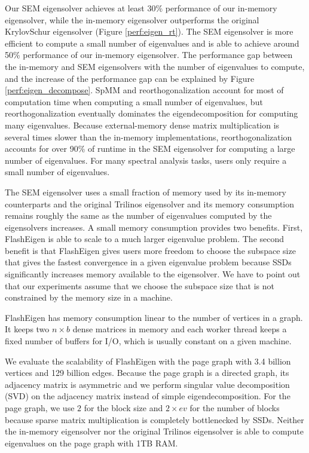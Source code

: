 Our SEM eigensolver achieves at least 30\% performance of our in-memory
eigensolver, while the in-memory eigensolver outperforms the original
KrylovSchur eigensolver (Figure \ref{perf:eigen_rt}). The SEM eigensolver
is more efficient to compute a small number of eigenvalues and is able
to achieve around 50\% performance of our in-memory eigensolver.
The performance gap between the in-memory and SEM eigensolvers with the number
of eigenvalues to compute, and the increase of the performance gap can be
explained by Figure \ref{perf:eigen_decompose}. SpMM and reorthogonalization
account for most of computation time when computing a small number of eigenvalues,
but reorthogonalization eventually dominates the eigendecomposition for computing
many eigenvalues. Because external-memory dense matrix multiplication is several
times slower than the in-memory implementations, reorthogonalization accounts for
over 90\% of runtime in the SEM eigensolver for computing a large number of
eigenvalues. For many spectral analysis tasks, users only require a small number
of eigenvalues.

%		

The SEM eigensolver uses a small fraction of memory used by its in-memory
counterparts and the original Trilinos eigensolver and its memory consumption
remains roughly the same as the number of eigenvalues computed by the eigensolvers
increases. A small memory consumption provides two benefits. First, FlashEigen
is able to scale to a much larger eigenvalue problem. The second benefit is that
FlashEigen gives users more freedom to choose the subspace size that gives the
fastest convergence in a given eigenvalue problem because SSDs significantly
increases memory available to the eigensolver. We have to point out that our
experiments assume that we choose the subspace size that is not constrained by
the memory size in a machine.

FlashEigen has memory consumption linear to the number of vertices in a graph.
It keeps two $n \times b$ dense matrices in memory and each worker thread
keeps a fixed number of buffers for I/O, which is usually constant on a given
machine.

We evaluate the scalability of FlashEigen with the page graph with 3.4 billion
vertices and 129 billion edges. Because the page graph is a directed graph,
its adjacency matrix is asymmetric and we perform singular value decomposition
(SVD) on the adjacency matrix instead of simple eigendecomposition. For the page
graph, we use $2$ for the block size and $2 \times ev$ for the number of blocks
because sparse matrix multiplication is completely bottlenecked by SSDs.
Neither the in-memory eigensolver nor the original Trilinos eigensolver is able
to compute eigenvalues on the page graph with 1TB RAM.


